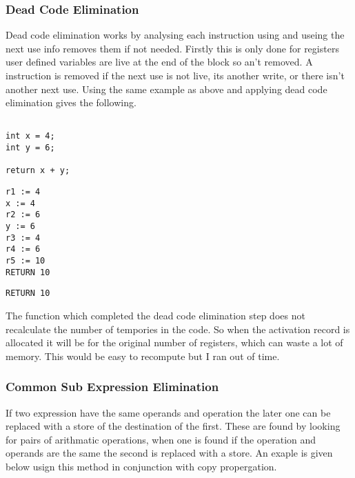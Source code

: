 \documentclass{article}
\begin{document}
\subsubsection{Dead Code Elimination}

Dead code elimination works by analysing each instruction using and useing the
next use info removes them if not needed. Firstly this is only done for registers
user defined variables are live at the end of the block so an't removed. A instruction
is removed if the next use is not live, its another write, or there isn't another
next use. Using the same example as above and applying dead code elimination gives
the following.

\begin{minipage}{0.3\textwidth}
\begin{lstlisting}

int x = 4;
int y = 6;

return x + y;

\end{lstlisting}
\end{minipage}%
\begin{minipage}{0.3\textwidth}
\begin{lstlisting}
r1 := 4
x := 4
r2 := 6
y := 6
r3 := 4
r4 := 6
r5 := 10
RETURN 10

\end{lstlisting}
\end{minipage}%
\begin{minipage}{0.3\textwidth}
\begin{lstlisting}
RETURN 10
\end{lstlisting}
\end{minipage}%

The function which completed the dead code elimination step does not recalculate
the number of tempories in the code. So when the activation record is allocated
it will be for the original number of registers, which can waste a lot of memory.
This would be easy to recompute but I ran out of time.

\subsubsection{Common Sub Expression Elimination}
If two expression have the same operands and operation the later one can be replaced
with a store of the destination of the first. These are found by looking for pairs
of arithmatic operations, when one is found if the operation and operands are the
same the second is replaced with a store. An exaple is given below usign this method
in conjunction with copy propergation.
\end{document}

